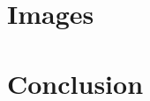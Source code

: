 \documentclass[letterpaper]{article}
\begin{document}
%        
%
%
%
%



    


    


    \section{Images}
    \label{Images}

    \section{Conclusion}
    \label{Conclusion}
\end{document}
